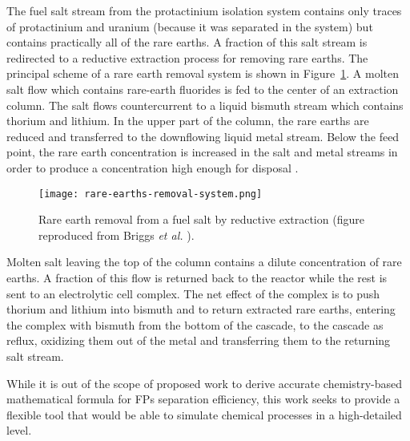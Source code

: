 The fuel salt stream from the protactinium isolation system contains only 
traces of protactinium and uranium (because it was separated in the system) 
but contains practically all of the rare earths. A fraction of this salt 
stream is redirected to a reductive extraction process for removing rare 
earths.  The principal scheme of a rare earth removal system is shown in 
Figure~\ref{fig:rare-earth-removal}. A molten salt flow which contains 
rare-earth fluorides is fed to the center of an extraction column. The salt 
flows countercurrent to a liquid bismuth stream which contains thorium and 
lithium. In the upper part of the column, the rare earths are reduced and 
transferred to the downflowing liquid metal stream. Below the feed point, the 
rare earth concentration is increased in the salt and metal streams in order 
to produce a concentration high enough for disposal 
\cite{briggs_molten-salt_1969}.
\begin{figure}[htbp!]
	\centering
	\texttt{[image: rare-earths-removal-system.png]}
	\caption{Rare earth removal from a fuel salt by reductive extraction 
	(figure 
		reproduced from Briggs \emph{et al.} \cite{briggs_molten-salt_1969}).}
	\label{fig:rare-earth-removal}
\end{figure}

Molten salt leaving the top of the column contains a dilute concentration of 
rare earths. A fraction of this flow is returned back to the reactor while the 
rest is sent to an electrolytic cell complex. The net effect of the complex is 
to push thorium and lithium into bismuth and to return extracted rare earths, 
entering the complex with bismuth from the bottom of the cascade, to the 
cascade as reflux, oxidizing them out of the metal and transferring them to 
the returning salt stream.

While it is out of the scope of proposed work to derive accurate 
chemistry-based mathematical formula for \glspl{FP} separation efficiency, 
this work seeks to provide a flexible tool that would be able to simulate 
chemical processes in a high-detailed level.

